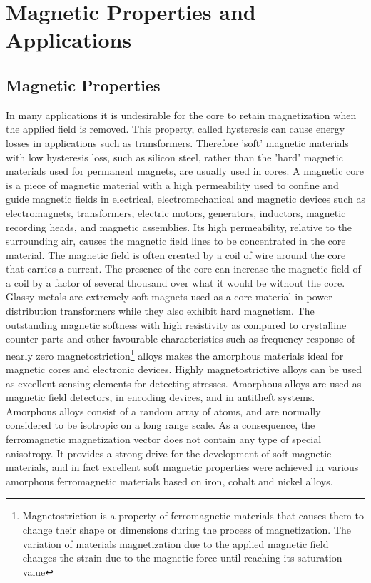 \chapter{Magnetic Properties and Applications}

\section{Magnetic Properties}
In many applications it is undesirable for the core to retain magnetization when the applied field is removed. This property, called hysteresis can cause energy losses in applications such as transformers. Therefore 'soft' magnetic materials with low hysteresis loss, such as silicon steel, rather than the 'hard' magnetic materials used for permanent magnets, are usually used in cores.
A magnetic core is a piece of magnetic material with a high permeability used to confine and guide magnetic fields in electrical, electromechanical and magnetic devices such as electromagnets, transformers, electric motors, generators, inductors, magnetic recording heads, and magnetic assemblies. Its high permeability, relative to the surrounding air, causes the magnetic field lines to be concentrated in the core material. The magnetic field is often created by a coil of wire around the core that carries a current. The presence of the core can increase the magnetic field of a coil by a factor of several thousand over what it would be without the core.
\\
Glassy metals are extremely soft magnets used as a core material in power distribution transformers while they also exhibit hard magnetism. The outstanding magnetic softness with high resistivity as compared to crystalline counter parts and other favourable characteristics such as frequency response of nearly zero magnetostriction\footnote{ Magnetostriction is a property of ferromagnetic materials that causes them to change their shape or dimensions during the process of magnetization. The variation of materials magnetization due to the applied magnetic field changes the strain due to the magnetic force until reaching its saturation value} alloys makes the amorphous materials ideal for magnetic cores and electronic devices. Highly magnetostrictive alloys can be used as excellent sensing elements for detecting stresses. Amorphous alloys are used as magnetic field detectors, in encoding devices, and in antitheft systems.
Amorphous alloys consist of a random array of atoms, and are normally considered to be isotropic on a long range scale. As a consequence, the ferromagnetic magnetization vector does not contain any type of special anisotropy. It provides a strong drive for the development of soft magnetic materials, and in fact excellent soft magnetic properties were achieved in various amorphous ferromagnetic materials based on iron, cobalt and nickel alloys.
